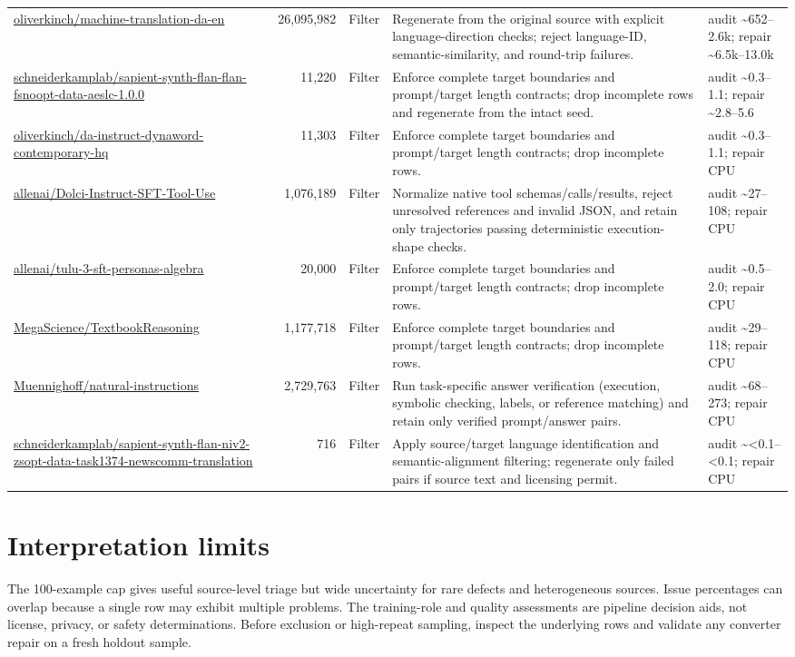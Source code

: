 \documentclass[10pt,a4paper]{article}
\begin{document}
\begin{longtable}{L{5.0cm} r L{1.2cm} L{13.0cm} L{3.3cm}}
\url{oliverkinch/machine-translation-da-en} & 26,095,982 & Filter & Regenerate from the original source with explicit language-direction checks; reject language-ID, semantic-similarity, and round-trip failures. & audit \textasciitilde{}652--2.6k; repair \textasciitilde{}6.5k--13.0k \\
\url{schneiderkamplab/sapient-synth-flan-flan-fsnoopt-data-aeslc-1.0.0} & 11,220 & Filter & Enforce complete target boundaries and prompt/target length contracts; drop incomplete rows and regenerate from the intact seed. & audit \textasciitilde{}0.3--1.1; repair \textasciitilde{}2.8--5.6 \\
\url{oliverkinch/da-instruct-dynaword-contemporary-hq} & 11,303 & Filter & Enforce complete target boundaries and prompt/target length contracts; drop incomplete rows. & audit \textasciitilde{}0.3--1.1; repair CPU \\
\url{allenai/Dolci-Instruct-SFT-Tool-Use} & 1,076,189 & Filter & Normalize native tool schemas/calls/results, reject unresolved references and invalid JSON, and retain only trajectories passing deterministic execution-shape checks. & audit \textasciitilde{}27--108; repair CPU \\
\url{allenai/tulu-3-sft-personas-algebra} & 20,000 & Filter & Enforce complete target boundaries and prompt/target length contracts; drop incomplete rows. & audit \textasciitilde{}0.5--2.0; repair CPU \\
\url{MegaScience/TextbookReasoning} & 1,177,718 & Filter & Enforce complete target boundaries and prompt/target length contracts; drop incomplete rows. & audit \textasciitilde{}29--118; repair CPU \\
\url{Muennighoff/natural-instructions} & 2,729,763 & Filter & Run task-specific answer verification (execution, symbolic checking, labels, or reference matching) and retain only verified prompt/answer pairs. & audit \textasciitilde{}68--273; repair CPU \\
\url{schneiderkamplab/sapient-synth-flan-niv2-zsopt-data-task1374-newscomm-translation} & 716 & Filter & Apply source/target language identification and semantic-alignment filtering; regenerate only failed pairs if source text and licensing permit. & audit \textasciitilde{}<0.1--<0.1; repair CPU \\
\end{longtable}

\normalsize
\section*{Interpretation limits}
The 100-example cap gives useful source-level triage but wide uncertainty for
rare defects and heterogeneous sources. Issue percentages can overlap because a
single row may exhibit multiple problems. The training-role and quality
assessments are pipeline decision aids, not license, privacy, or safety
determinations. Before exclusion or high-repeat sampling, inspect the underlying
rows and validate any converter repair on a fresh holdout sample.
\end{document}
